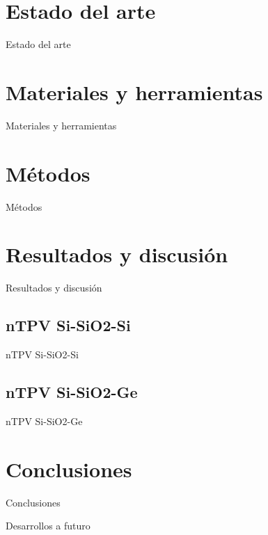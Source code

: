 \documentclass[spanish,a4paper]{beamer}%
\makeatletter
\def\beamer@writeslidentry@miniframesoff{%
  \expandafter\beamer@ifempty\expandafter{\beamer@framestartpage}{}%
  {%
    \clearpage\beamer@notesactions%
  }
}
\newcommand*{\miniframesoff}{\let\beamer@writeslidentry=\beamer@writeslidentry@miniframesoff}
\makeatother
\begin{document}
	\section{Estado del arte}
	\begin{frame}{Estado del arte}
		
	\end{frame}

	\section{Materiales y herramientas}
	\begin{frame}{Materiales y herramientas}
		
	\end{frame}


	\section{Métodos}
	\begin{frame}{Métodos}
		
	\end{frame}

	\section{Resultados y discusión}
	\begin{frame}{Resultados y discusión}
		
	\end{frame}
	\subsection{nTPV Si-SiO2-Si}
\begin{frame}{nTPV Si-SiO2-Si}

		
	\end{frame}
		\subsection{nTPV Si-SiO2-Ge}
\begin{frame}{nTPV Si-SiO2-Ge}

		
	\end{frame}
	\section{Conclusiones}
	\begin{frame}{Conclusiones}
	\end{frame}
	\begin{frame}{Desarrollos a futuro}
		
	\end{frame}
	\miniframesoff
	\section{}
	\begin{frame}	

	\end{frame}
\end{document}
